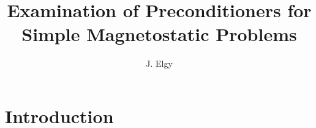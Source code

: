 \documentclass[a4paper,12]{elsarticle}
\theoremstyle{definition}
\begin{document}

\begin{frontmatter}

\title{Examination of Preconditioners for Simple Magnetostatic Problems}
%
\cortext[cor1]{*}
 
\author[1]{J. Elgy} 


\begin{abstract}

\end{abstract}

\begin{keyword} 
\end{keyword}

\end{frontmatter}

\section{Introduction}\label{sect:intro}
\end{document}
